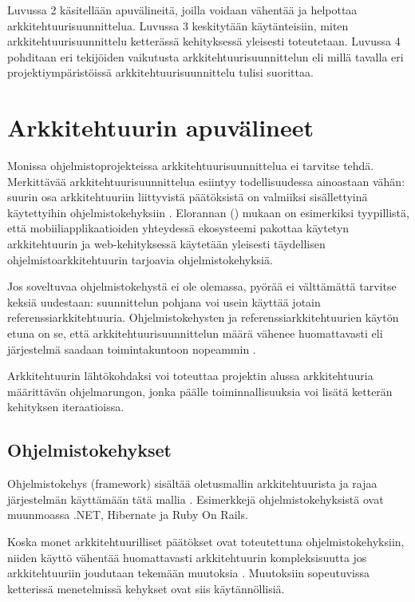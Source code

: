 Luvussa 2 käsitellään apuvälineitä, joilla voidaan vähentää ja helpottaa arkkitehtuurisuunnittelua. Luvussa 3 keskitytään käytänteisiin, miten arkkitehtuurisuunnittelu ketterässä kehityksessä yleisesti toteutetaan. Luvussa 4 pohditaan eri tekijöiden vaikutusta arkkitehtuurisuunnittelun eli millä tavalla eri projektiympäristöissä arkkitehtuurisuunnittelu tulisi suorittaa.

\chapter{Arkkitehtuurin apuvälineet}
Monissa ohjelmistoprojekteissa arkkitehtuurisuunnittelua ei tarvitse tehdä.
Merkittävää arkkitehtuurisuunnittelua esiintyy todellisuudessa ainoastaan vähän: suurin osa arkkitehtuuriin liittyvistä päätöksistä on valmiiksi sisällettyinä käytettyihin ohjelmistokehyksiin \citep{bellomo2014agilely}. Elorannan (\citeyear{eloranta2015techniques}) mukaan on esimerkiksi tyypillistä, että mobiiliapplikaatioiden yhteydessä ekosysteemi pakottaa käytetyn arkkitehtuurin ja web-kehityksessä käytetään yleisesti täydellisen ohjelmistoarkkitehtuurin tarjoavia ohjelmistokehyksiä.

Jos soveltuvaa ohjelmistokehystä ei ole olemassa, pyörää ei välttämättä tarvitse keksiä uudestaan: suunnittelun pohjana voi usein käyttää jotain referenssiarkkitehtuuria. Ohjelmistokehysten ja referenssiarkkitehtuurien käytön etuna on se, että arkkitehtuurisuunnittelun määrä vähenee huomattavasti eli järjestelmä saadaan toimintakuntoon nopeammin \citep{waterman_how_2015}.

Arkkitehtuurin lähtökohdaksi voi toteuttaa projektin alussa arkkitehtuuria määrittävän ohjelmarungon, jonka päälle toiminnallisuuksia voi lisätä ketterän kehityksen iteraatioissa.

\section{Ohjelmistokehykset}
Ohjelmistokehys (framework) sisältää oletusmallin arkkitehtuurista ja rajaa järjestelmän käyttämään tätä mallia \citep{waterman_how_2015}. Esimerkkejä ohjelmistokehyksistä ovat muunmoassa .NET, Hibernate ja Ruby On Rails.

Koska monet arkkitehtuurilliset päätökset ovat toteutettuna ohjelmistokehyksiin, niiden käyttö vähentää huomattavasti arkkitehtuurin kompleksisuutta jos arkkitehtuuriin joudutaan tekemään muutoksia \citep{waterman_how_2015}. Muutoksiin sopeutuvissa ketterissä menetelmissä kehykset ovat siis käytännöllisiä.

